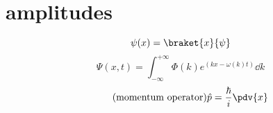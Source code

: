 \section{amplitudes}

\[\psi(x)=\braket{x}{\psi}\]
\[\Psi(x,t)=\int_{-\infty}^{+\infty}\Phi(k)e^{(kx-\omega(k)t)}\dd{k}\]
\[\tag{momentum operator}\hat{p}=\frac{\hbar}{i}\pdv{x}\]